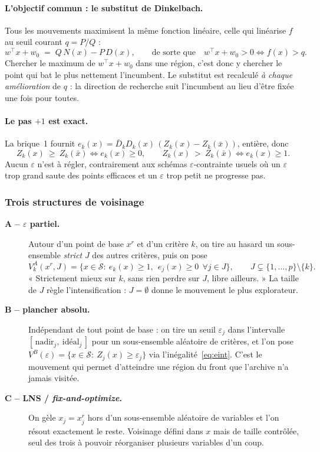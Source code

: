 \documentclass[11pt,a4paper]{article}
\theoremstyle{plain}
\theoremstyle{remark}
\newcommand{\Scal}{\mathcal{S}}
\begin{document}
\paragraph{L'objectif commun : le substitut de Dinkelbach.} Tous les
mouvements maximisent la même fonction linéaire, celle qui linéarise $f$ au
seuil courant $q=P/Q$ :
\[
  w^{\top}x+w_0 \;=\; Q\,N(x)-P\,D(x),
  \qquad\text{de sorte que}\quad
  w^{\top}x+w_0>0 \iff f(x)>q .
\]
Chercher le maximum de $w^{\top}x+w_0$ dans une région, c'est donc y
chercher le point qui bat le plus nettement l'incumbent. Le substitut est
recalculé \emph{à chaque amélioration} de $q$ : la direction de recherche
suit l'incumbent au lieu d'être fixée une fois pour toutes.

\paragraph{Le pas $+1$ est exact.} La brique~1 fournit
$e_k(x)=\bar D_k D_k(x)\,(Z_k(x)-Z_k(\bar x))$, entière, donc
\[
  Z_k(x)\ \ge\ Z_k(\bar x)\iff e_k(x)\ge 0,
  \qquad
  Z_k(x)\ >\ Z_k(\bar x)\iff e_k(x)\ge 1 .
\]
Aucun $\varepsilon$ n'est à régler, contrairement aux schémas
$\varepsilon$-contrainte usuels où un $\varepsilon$ trop grand saute des
points efficaces et un $\varepsilon$ trop petit ne progresse pas.

\subsubsection*{Trois structures de voisinage}

\begin{description}
\item[\textbf{A -- $\varepsilon$ partiel.}] Autour d'un point de base
  $x^r$ et d'un critère $k$, on tire au hasard un sous-ensemble
  \emph{strict} $J$ des autres critères, puis on pose
  \[
    V^A_k(x^r,J)=\bigl\{x\in\Scal:\ e_k(x)\ge 1,\ \
      e_j(x)\ge 0\ \ \forall j\in J\bigr\},
    \qquad J\subsetneq\{1,\dots,p\}\setminus\{k\}.
  \]
  « Strictement mieux sur $k$, sans rien perdre sur $J$, libre ailleurs. »
  La taille de $J$ règle l'intensification : $J=\emptyset$ donne le
  mouvement le plus explorateur.

\item[\textbf{B -- plancher absolu.}] Indépendant de tout point de base :
  on tire un seuil $\varepsilon_j$ dans l'intervalle
  $[\,\text{nadir}_j,\ \text{idéal}_j\,]$ pour un sous-ensemble aléatoire
  de critères, et l'on pose
  $V^B(\varepsilon)=\{x\in\Scal:\ Z_j(x)\ge\varepsilon_j\}$
  via l'inégalité~\eqref{eq:eint}. C'est le mouvement qui permet
  d'atteindre une région
  du front que l'archive n'a jamais visitée.

\item[\textbf{C -- LNS / \emph{fix-and-optimize}.}] On gèle
  $x_j=x^r_j$ hors d'un sous-ensemble aléatoire de variables et l'on résout
  exactement le reste. Voisinage défini dans $x$ mais de taille contrôlée,
  seul des trois à pouvoir réorganiser plusieurs variables d'un coup.
\end{description}
\end{document}
